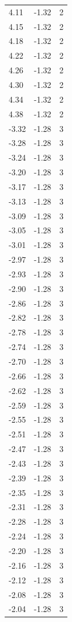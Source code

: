 \begin{longtable}{lrr}
  4.11 & -1.32 & 2 \\
  4.15 & -1.32 & 2 \\
  4.18 & -1.32 & 2 \\
  4.22 & -1.32 & 2 \\
  4.26 & -1.32 & 2 \\
  4.30 & -1.32 & 2 \\
  4.34 & -1.32 & 2 \\
  4.38 & -1.32 & 2 \\
  -3.32 & -1.28 & 3 \\
  -3.28 & -1.28 & 3 \\
  -3.24 & -1.28 & 3 \\
  -3.20 & -1.28 & 3 \\
  -3.17 & -1.28 & 3 \\
  -3.13 & -1.28 & 3 \\
  -3.09 & -1.28 & 3 \\
  -3.05 & -1.28 & 3 \\
  -3.01 & -1.28 & 3 \\
  -2.97 & -1.28 & 3 \\
  -2.93 & -1.28 & 3 \\
  -2.90 & -1.28 & 3 \\
  -2.86 & -1.28 & 3 \\
  -2.82 & -1.28 & 3 \\
  -2.78 & -1.28 & 3 \\
  -2.74 & -1.28 & 3 \\
  -2.70 & -1.28 & 3 \\
  -2.66 & -1.28 & 3 \\
  -2.62 & -1.28 & 3 \\
  -2.59 & -1.28 & 3 \\
  -2.55 & -1.28 & 3 \\
  -2.51 & -1.28 & 3 \\
  -2.47 & -1.28 & 3 \\
  -2.43 & -1.28 & 3 \\
  -2.39 & -1.28 & 3 \\
  -2.35 & -1.28 & 3 \\
  -2.31 & -1.28 & 3 \\
  -2.28 & -1.28 & 3 \\
  -2.24 & -1.28 & 3 \\
  -2.20 & -1.28 & 3 \\
  -2.16 & -1.28 & 3 \\
  -2.12 & -1.28 & 3 \\
  -2.08 & -1.28 & 3 \\
  -2.04 & -1.28 & 3 \\

\end{longtable}

